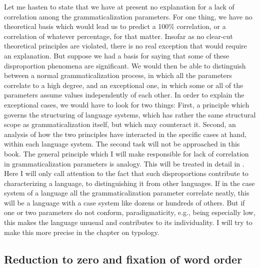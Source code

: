 Let me hasten to state that we have at present no explanation for a lack of correlation among the grammaticalization parameters. For one thing, we have no theoretical basis which would lead us to predict a 100\% correlation, or a correlation of whatever percentage, for that matter. Insofar as no clear-cut theoretical principles are violated, there is no real exception that would require an explanation. But suppose we had a basis for saying that some of these disproportion phenomena are significant. We would then be able to distinguish between a normal grammaticalization process, in which all the parameters correlate to a high degree, and an exceptional one, in which some or all of the parameters assume values independently of each other. In order to explain the exceptional cases, we would have to look for two things: First, a principle which governs the structuring of language systems, which has rather the same structural scope as grammaticalization itself, but which may counteract it. Second, an analysis of how the two principles have interacted in the specific cases at hand, within each language system. The second task will not be approached in this book. The general principle which I will make responsible for lack of correlation in grammaticalization parameters is analogy. This will be treated in detail in . Here I will only call attention to the fact that such disproportions contribute to characterizing a language, to distinguishing it from other languages. If in the case system of a language all the grammaticalization parameter correlate neatly, this will be a language with a case system like dozens or hundreds of others. But if one or two parameters do not conform, paradigmaticity, e.g., being especially low, this makes the language unusual and contributes to its individuality. I will try to make this more precise in the chapter on typology.

\subsection{Reduction to zero and fixation of word order} \label{sec:4.4.4}

